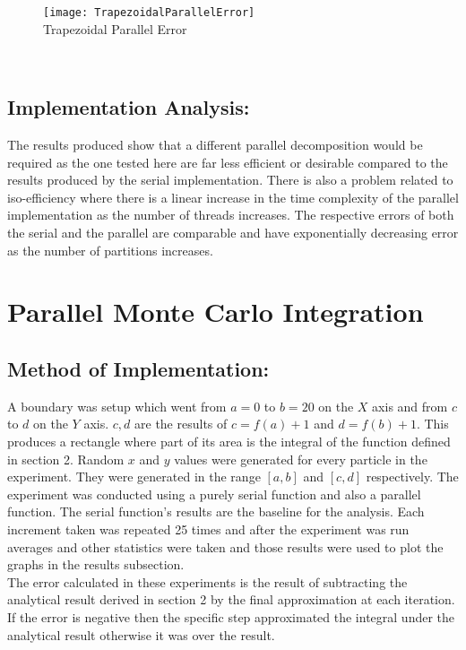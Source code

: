 \documentclass[11pt]{article}
\begin{document}
\begin{page}
\begin{figure}[ht]
\centering
     \texttt{[image: TrapezoidalParallelError]}\\
    Trapezoidal Parallel Error
\end{figure}\\

\break
\subsection{Implementation Analysis:}
\noindent The results produced show that a different parallel decomposition would be required as the one tested here are far less efficient or desirable compared to the results produced by the serial implementation. There is also a problem related to iso-efficiency where there is a linear increase in the time complexity of the parallel implementation as the number of threads increases. The respective errors of both the serial and the parallel are comparable and have exponentially decreasing error as the number of partitions increases.

\section{Parallel Monte Carlo Integration}
\subsection{Method of Implementation:}
\noindent A boundary was setup which went from $a = 0$ to $b = 20$ on the $X$ axis and from $c$ to $d$ on the $Y$ axis. $c,d$ are the results of $c = f(a) + 1$ and $d = f(b) + 1$. This produces a rectangle where part of its area is the integral of the function defined in section 2. Random $x$ and $y$ values were generated for every particle in the experiment. They were generated in the range $[a,b]$ and $[c,d]$ respectively. The experiment was conducted using a purely serial function and also a parallel function. The serial function's results are the baseline for the analysis. Each increment taken was repeated 25 times and after the experiment was run averages and other statistics were taken and those results were used to plot the graphs in the results subsection.\\

\noindent The error calculated in these experiments is the result of subtracting the analytical result derived in section 2 by the final approximation at each iteration. If the error is negative then the specific step approximated the integral under the analytical result otherwise it was over the result.\\


\end{page}
\end{document}
